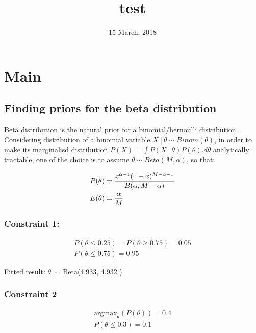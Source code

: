 \documentclass[]{article}
\title{test}
\author{}
\date{15 March, 2018}
\newcommand\gvn[1][]{\:#1\vert\:}
\theoremstyle{definition}
\theoremstyle{definition}
\theoremstyle{definition}
\theoremstyle{remark}
\begin{document}
\maketitle

{
\setcounter{tocdepth}{4}
\tableofcontents
}
\section{Main}\label{main}

\subsection{Finding priors for the beta
distribution}\label{finding-priors-for-the-beta-distribution}

Beta distribution is the natural prior for a binomial/bernoulli
distribution. Considering distribution of a binomial variable
\(X\gvn\theta\sim Binom(\theta)\), in order to make its marginalisd
distribution \(P(X) = \int P(X\gvn\theta)P(\theta).d\theta\)
analytically tractable, one of the choice is to assume
\(\theta\sim Beta(M,\alpha)\), so that:

\[
\begin{aligned}
P(\theta) &=\frac{x^{\alpha - 1}(1-x)^{M-\alpha-1}}{B(\alpha,M-\alpha)}
\\
E(\theta) &={\alpha\over M }
\end{aligned}
\]

\subsubsection{Constraint 1:}\label{constraint-1}

\[
\begin{aligned}
P(\theta\le 0.25) = P(\theta\ge 0.75) =  0.05 \\
P(\theta\le 0.75)=0.95
\end{aligned}
\]

Fitted result: \(\theta\sim\) Beta(4.933, 4.932 )

\subsubsection{Constraint 2}\label{constraint-2}

\[
\begin{aligned}
\text{argmax}_\theta(P(\theta))=0.4 \\
P(\theta\le 0.3) = 0.1
\end{aligned}
\]
\end{document}
